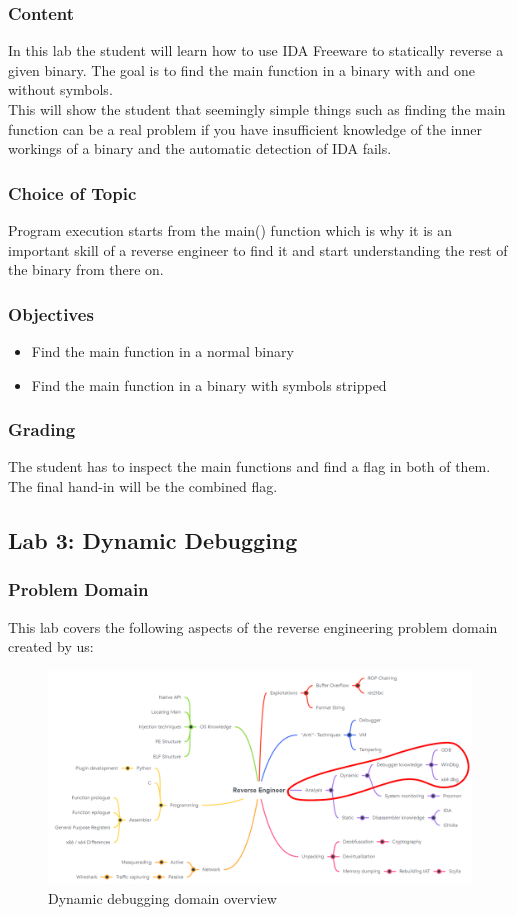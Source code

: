 \subsubsection*{Content}
In this lab the student will learn how to use IDA Freeware to statically reverse a given binary. The goal is to find the main function in a binary with and one without symbols. \\
This will show the student that seemingly simple things such as finding the main function can be a real problem if you have insufficient knowledge of the inner workings of a binary and the automatic detection of IDA fails.
\subsubsection*{Choice of Topic}
Program execution starts from the main() function which is why it is an important skill of a reverse engineer to find it and start understanding the rest of the binary from there on.
\subsubsection*{Objectives}
\begin{itemize}
    \item Find the main function in a normal binary
    \item Find the main function in a binary with symbols stripped
\end{itemize}
\subsubsection*{Grading}
The student has to inspect the main functions and find a flag in both of them. The final hand-in will be the combined flag.
\pagebreak

\subsection{Lab 3: Dynamic Debugging}
\subsubsection*{Problem Domain}
This lab covers the following aspects of the reverse engineering problem domain created by us:
\vspace{-2ex}
\begin{figure}[H]
    \includegraphics[width=\textwidth]{resources/dynamic-overview-light.png}
    \caption{Dynamic debugging domain overview}
    \label{fig:dynamic-overview}
\end{figure}
